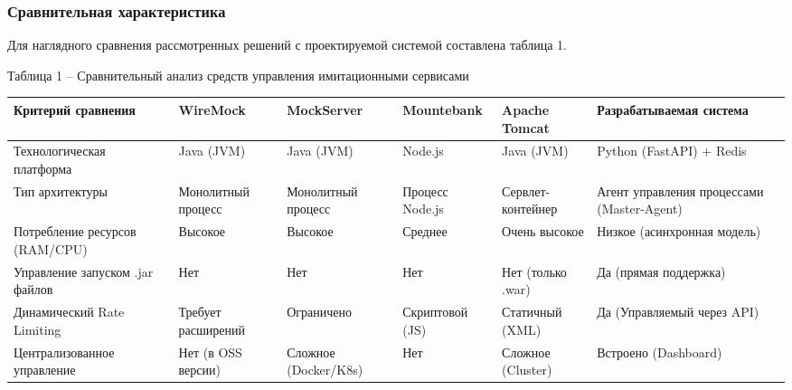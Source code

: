 \documentclass[
]{article}
\newcounter{none} %
\begin{document}
\subsubsection{Сравнительная
характеристика}\label{ux441ux440ux430ux432ux43dux438ux442ux435ux43bux44cux43dux430ux44f-ux445ux430ux440ux430ux43aux442ux435ux440ux438ux441ux442ux438ux43aux430}

Для наглядного сравнения рассмотренных решений с проектируемой системой
составлена таблица 1.

Таблица 1 -- Сравнительный анализ средств управления имитационными
сервисами

{\def\LTcaptype{none} %
\begin{longtable}[]{@{}
  >{\raggedright\arraybackslash}p{}
  >{\raggedright\arraybackslash}p{}
  >{\raggedright\arraybackslash}p{}
  >{\raggedright\arraybackslash}p{}
  >{\raggedright\arraybackslash}p{}
  >{\raggedright\arraybackslash}p{}@{}}
\toprule\noalign{}
\begin{minipage}[b]{\linewidth}\centering
\textbf{Критерий сравнения}
\end{minipage} & \begin{minipage}[b]{\linewidth}\centering
\textbf{WireMock}
\end{minipage} & \begin{minipage}[b]{\linewidth}\centering
\textbf{MockServer}
\end{minipage} & \begin{minipage}[b]{\linewidth}\centering
\textbf{Mountebank}
\end{minipage} & \begin{minipage}[b]{\linewidth}\centering
\textbf{Apache Tomcat}
\end{minipage} & \begin{minipage}[b]{\linewidth}\centering
\textbf{Разрабатываемая система}
\end{minipage} \\
\midrule\noalign{}
\endhead
\bottomrule\noalign{}
\endlastfoot
Технологическая платформа & Java (JVM) & Java (JVM) & Node.js & Java
(JVM) & Python (FastAPI) + Redis \\
Тип архитектуры & Монолитный процесс & Монолитный процесс & Процесс
Node.js & Сервлет-контейнер & Агент управления процессами
(Master-Agent) \\
Потребление ресурсов (RAM/CPU) & Высокое & Высокое & Среднее & Очень
высокое & Низкое (асинхронная модель) \\
Управление запуском .jar файлов & Нет & Нет & Нет & Нет (только .war) &
Да (прямая поддержка) \\
Динамический Rate Limiting & Требует расширений & Ограничено &
Скриптовой (JS) & Статичный (XML) & Да (Управляемый через API) \\
Централизованное управление & Нет (в OSS версии) & Сложное (Docker/K8s)
& Нет & Сложное (Cluster) & Встроено (Dashboard) \\
\end{longtable}
}
\end{document}
